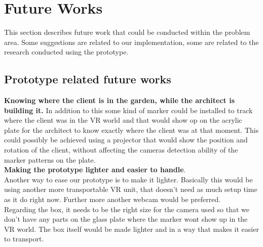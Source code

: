 \chapter{Future Works}
This section describes future work that could be conducted within the problem area. Some suggestions are related to our implementation, some are related to the research conducted using the prototype.
\section{Prototype related future works}
\textbf{Knowing where the client is in the garden, while the architect is building it.} In addition to this some kind of marker could be installed to track where the client was in the VR world and that would show op on the acrylic plate for the architect to know exactly where the client was at that moment. This could possibly be achieved using a projector that would show the position and rotation of the client, without affecting the cameras detection ability of the marker patterns on the plate.\\

\textbf{Making the prototype lighter and easier to handle}.\\
Another way to ease our prototype is to make it lighter. Basically this would be using another more transportable VR unit, that doesn't need as much setup time as it do right now. Further more another webcam would be preferred.\\
Regarding the box, it needs to be the right size for the camera used so that we don't have any parts on the glass plate where the marker wont show up in the VR world. The box itself would be made lighter and in a way that makes it easier to transport.\\

